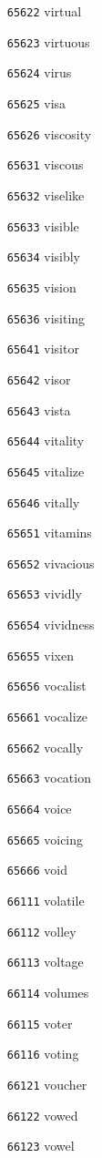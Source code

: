 \documentclass[twoside,11pt]{article}
\begin{document}
\begin{multicols}{5}
\begin{enumerate}
\item[\texttt{65622}] virtual
\item[\texttt{65623}] virtuous
\item[\texttt{65624}] virus
\item[\texttt{65625}] visa
\item[\texttt{65626}] viscosity
\item[\texttt{65631}] viscous
\item[\texttt{65632}] viselike
\item[\texttt{65633}] visible
\item[\texttt{65634}] visibly
\item[\texttt{65635}] vision
\item[\texttt{65636}] visiting
\item[\texttt{65641}] visitor
\item[\texttt{65642}] visor
\item[\texttt{65643}] vista
\item[\texttt{65644}] vitality
\item[\texttt{65645}] vitalize
\item[\texttt{65646}] vitally
\item[\texttt{65651}] vitamins
\item[\texttt{65652}] vivacious
\item[\texttt{65653}] vividly
\item[\texttt{65654}] vividness
\item[\texttt{65655}] vixen
\item[\texttt{65656}] vocalist
\item[\texttt{65661}] vocalize
\item[\texttt{65662}] vocally
\item[\texttt{65663}] vocation
\item[\texttt{65664}] voice
\item[\texttt{65665}] voicing
\item[\texttt{65666}] void
\item[\texttt{66111}] volatile
\item[\texttt{66112}] volley
\item[\texttt{66113}] voltage
\item[\texttt{66114}] volumes
\item[\texttt{66115}] voter
\item[\texttt{66116}] voting
\item[\texttt{66121}] voucher
\item[\texttt{66122}] vowed
\item[\texttt{66123}] vowel

\end{enumerate}
\end{multicols}
\end{document}
